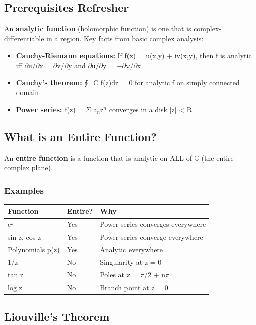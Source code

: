 \documentclass[12pt,a4paper,openany]{book}
\begin{document}
{{\subsection{Prerequisites Refresher}

An \textbf{analytic function} (holomorphic function) is one that is complex-differentiable in a region. Key facts from basic complex analysis:

\begin{itemize}[leftmargin=*]
  \item \textbf{Cauchy-Riemann equations:} If f(z) = u(x,y) + iv(x,y), then f is analytic iff $\partial$u/$\partial$x = $\partial$v/$\partial$y and $\partial$u/$\partial$y = −$\partial$v/$\partial$x
  \item \textbf{Cauchy's theorem:} ∮_C f(z)dz = 0 for analytic f on simply connected domain
  \item \textbf{Power series:} f(z) = $\Sigma$ a$_n$z$^n$ converges in a disk |z| < R
\end{itemize}

\subsection{What is an Entire Function?}

An \textbf{entire function} is a function that is analytic on ALL of $\mathbb{C}$ (the entire complex plane).

\subsubsection{Examples}
\begin{center}
\begin{tabular}{|l|l|l|}
\hline
\textbf{Function} & \textbf{Entire?} & \textbf{Why} \\
\hline
eᶻ & Yes & Power series converges everywhere \\
\hline
sin z, cos z & Yes & Power series converge everywhere \\
\hline
Polynomials p(z) & Yes & Analytic everywhere \\
\hline
1/z & No & Singularity at z = 0 \\
\hline
tan z & No & Poles at z = $\pi$/2 + n$\pi$ \\
\hline
log z & No & Branch point at z = 0 \\
\hline
\end{tabular}
\end{center}

\subsection{Liouville's Theorem }

}}
\end{document}
